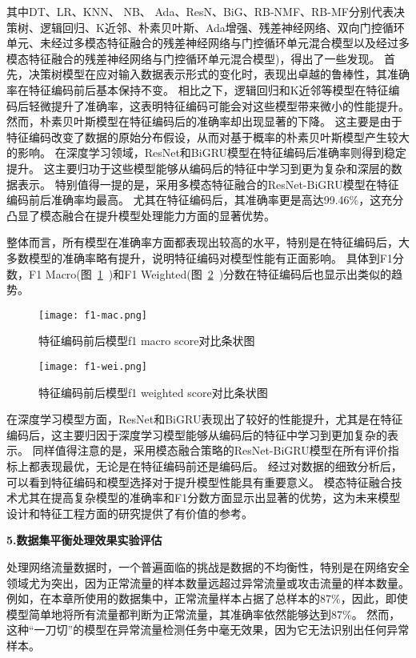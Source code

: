 其中DT、LR、KNN、 NB、 Ada、ResN、BiG、RB-NMF、RB-MF分别代表决策树、逻辑回归、K近邻、朴素贝叶斯、Ada增强、残差神经网络、双向门控循环单元、未经过多模态特征融合的残差神经网络与门控循环单元混合模型以及经过多模态特征融合的残差神经网络与门控循环单元混合模型)，得出了一些发现。
首先，决策树模型在应对输入数据表示形式的变化时，表现出卓越的鲁棒性，其准确率在特征编码前后基本保持不变。
相比之下，逻辑回归和K近邻等模型在特征编码后轻微提升了准确率，这表明特征编码可能会对这些模型带来微小的性能提升。
然而，朴素贝叶斯模型在特征编码后的准确率却出现显著的下降。
这主要是由于特征编码改变了数据的原始分布假设，从而对基于概率的朴素贝叶斯模型产生较大的影响。
在深度学习领域，ResNet和BiGRU模型在特征编码后准确率则得到稳定提升。
这主要归功于这些模型能够从编码后的特征中学习到更为复杂和深层的数据表示。
特别值得一提的是，采用多模态特征融合的ResNet-BiGRU模型在特征编码前后准确率均最高。
尤其在特征编码后，其准确率更是高达99.46\%，这充分凸显了模态融合在提升模型处理能力方面的显著优势。\par


整体而言，所有模型在准确率方面都表现出较高的水平，特别是在特征编码后，大多数模型的准确率略有提升，说明特征编码对模型性能有正面影响。
具体到F1分数，F1 Macro(图~\ref{fig:f1_macro_score}~)和F1 Weighted(图~\ref{fig:f1_weighted_score}~)分数在特征编码后也显示出类似的趋势。
\begin{figure}[htbp]
	\centering
	\texttt{[image: f1-mac.png]}
	\caption{特征编码前后模型f1 macro score对比条状图}
	\label{fig:f1_macro_score}
\end{figure}
\begin{figure}[htbp]
	\centering
	\texttt{[image: f1-wei.png]}
	\caption{特征编码前后模型f1 weighted score对比条状图}
	\label{fig:f1_weighted_score}
\end{figure}
在深度学习模型方面，ResNet和BiGRU表现出了较好的性能提升，尤其是在特征编码后，这主要归因于深度学习模型能够从编码后的特征中学习到更加复杂的表示。
同样值得注意的是，采用模态融合策略的ResNet-BiGRU模型在所有评价指标上都表现最优，无论是在特征编码前还是编码后。
经过对数据的细致分析后，可以看到特征编码和模型选择对于提升模型性能具有重要意义。
模态特征融合技术尤其在提高复杂模型的准确率和F1分数方面显示出显著的优势，这为未来模型设计和特征工程方面的研究提供了有价值的参考。\par

\textbf{5.数据集平衡处理效果实验评估}\par
处理网络流量数据时，一个普遍面临的挑战是数据的不均衡性，特别是在网络安全领域尤为突出，因为正常流量的样本数量远超过异常流量或攻击流量的样本数量。
例如，在本章所使用的数据集中，正常流量样本占据了总样本的87\%，因此，即使模型简单地将所有流量都判断为正常流量，其准确率依然能够达到87\%。
然而，这种“一刀切”的模型在异常流量检测任务中毫无效果，因为它无法识别出任何异常样本。\par

